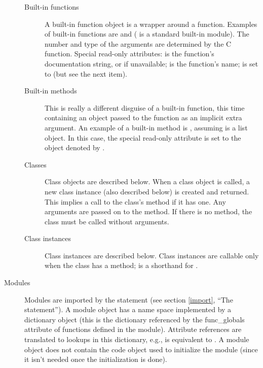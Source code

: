 \begin{description}
\begin{description}

\item[Built-in functions]
A built-in function object is a wrapper around a \C{} function.  Examples
of built-in functions are  and 
( is a standard built-in module).
The number and type of the arguments are
determined by the C function.
Special read-only attributes:  is the function's
documentation string, or  if unavailable; 
is the function's name;  is set to  (but see
the next item).

\item[Built-in methods]
This is really a different disguise of a built-in function, this time
containing an object passed to the \C{} function as an implicit extra
argument.  An example of a built-in method is
, assuming
 is a list object.
In this case, the special read-only attribute  is set
to the object denoted by .

\item[Classes]
Class objects are described below.  When a class object is called,
a new class instance (also described below) is created and
returned.  This implies a call to the class's  method
if it has one.  Any arguments are passed on to the 
method.  If there is no  method, the class must be called
without arguments.

\item[Class instances]
Class instances are described below.  Class instances are callable
only when the class has a  method; 
is a shorthand for .

\end{description}

\item[Modules]
Modules are imported by the  statement (see section
\ref{import}, ``The  statement'').
A module object has a name space implemented by a dictionary object
(this is the dictionary referenced by the func_globals attribute of
functions defined in the module).  Attribute references are translated
to lookups in this dictionary, e.g.,  is equivalent to
.
A module object does not contain the code object used to
initialize the module (since it isn't needed once the initialization
is done).


\end{description}

